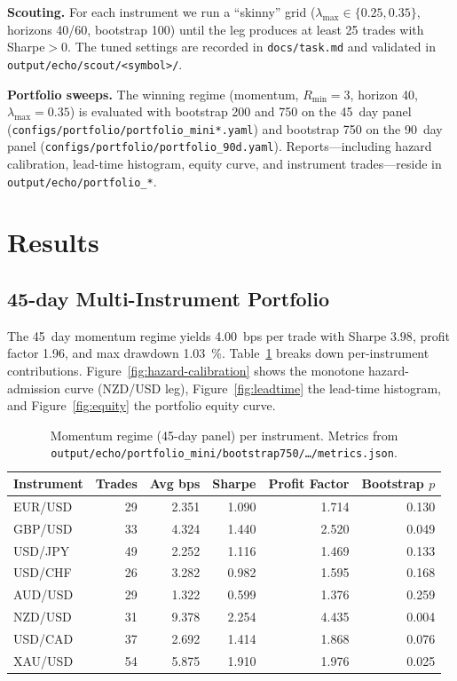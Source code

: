 \documentclass[11pt]{article}
\begin{document}
\textbf{Scouting.} For each instrument we run a ``skinny'' grid (\(\lambda_{\max}\in\{0.25,0.35\}\), horizons 40/60, bootstrap 100) until the leg produces at least 25 trades with Sharpe\(>0\). The tuned settings are recorded in \texttt{docs/task.md} and validated in \texttt{output/echo/scout/<symbol>/}.

\textbf{Portfolio sweeps.} The winning regime (momentum, \(R_{\min}=3\), horizon 40, \(\lambda_{\max}=0.35\)) is evaluated with bootstrap 200 and 750 on the \SI{45}{day} panel (\texttt{configs/portfolio/portfolio\_mini*.yaml}) and bootstrap 750 on the \SI{90}{day} panel (\texttt{configs/portfolio/portfolio\_90d.yaml}). Reports---including hazard calibration, lead-time histogram, equity curve, and instrument trades---reside in \texttt{output/echo/portfolio\_*}.

\section{Results}

\subsection{45-day Multi-Instrument Portfolio}
The \SI{45}{day} momentum regime yields \SI{4.00}{bps} per trade with Sharpe \(3.98\), profit factor 1.96, and max drawdown \SI{1.03}{\percent}. Table~\ref{tab:momentum45} breaks down per-instrument contributions. Figure~\ref{fig:hazard-calibration} shows the monotone hazard-admission curve (NZD/USD leg), Figure~\ref{fig:leadtime} the lead-time histogram, and Figure~\ref{fig:equity} the portfolio equity curve.

\begin{table}[h]
  \centering
  \caption{Momentum regime (45-day panel) per instrument. Metrics from \texttt{output/echo/portfolio\_mini/bootstrap750/\dots/metrics.json}.}
  \label{tab:momentum45}
  \begin{tabular}{lrrrrr}
    \toprule
    Instrument & Trades & Avg bps & Sharpe & Profit Factor & Bootstrap $p$ \\
    \midrule
    EUR/USD & 29 & 2.351 & 1.090 & 1.714 & 0.130 \\
    GBP/USD & 33 & 4.324 & 1.440 & 2.520 & 0.049 \\
    USD/JPY & 49 & 2.252 & 1.116 & 1.469 & 0.133 \\
    USD/CHF & 26 & 3.282 & 0.982 & 1.595 & 0.168 \\
    AUD/USD & 29 & 1.322 & 0.599 & 1.376 & 0.259 \\
    NZD/USD & 31 & 9.378 & 2.254 & 4.435 & 0.004 \\
    USD/CAD & 37 & 2.692 & 1.414 & 1.868 & 0.076 \\
    XAU/USD & 54 & 5.875 & 1.910 & 1.976 & 0.025 \\
    \bottomrule
  \end{tabular}
\end{table}
\end{document}

